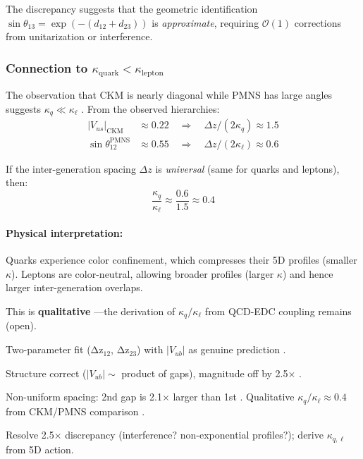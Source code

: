 The discrepancy suggests that the geometric identification
$\sin\theta_{13} = \exp(-(d_{12}+d_{23}))$ is \emph{approximate}, requiring
$\mathcal{O}(1)$ corrections from unitarization or interference.

\subsubsection{Connection to $\kappa_{\text{quark}} < \kappa_{\text{lepton}}$}

The observation that CKM is nearly diagonal while PMNS has large angles
suggests $\kappa_q \ll \kappa_\ell$ \tagP{}. From the observed hierarchies:
\begin{align}
    |V_{us}|_{\text{CKM}} &\approx 0.22 \quad\Rightarrow\quad
    \Delta z/(2\kappa_q) \approx 1.5 \\
    \sin\theta_{12}^{\text{PMNS}} &\approx 0.55 \quad\Rightarrow\quad
    \Delta z/(2\kappa_\ell) \approx 0.6
\end{align}

If the inter-generation spacing $\Delta z$ is \emph{universal} (same for quarks
and leptons), then:
\begin{equation}
    \frac{\kappa_q}{\kappa_\ell} \approx \frac{0.6}{1.5} \approx 0.4
    \label{eq:ch7_kappa_ratio}
\end{equation}

\paragraph{Physical interpretation:}
Quarks experience color confinement, which compresses their 5D profiles
(smaller $\kappa$). Leptons are color-neutral, allowing broader profiles
(larger $\kappa$) and hence larger inter-generation overlaps.

This is \textbf{qualitative} \tagI{}---the derivation of $\kappa_q/\kappa_\ell$
from QCD-EDC coupling remains (open).

\begin{tcolorbox}[colback=yellow!10, colframe=yellow!50!black,
    title=\textbf{Attempt 2.1 Summary: YELLOW}]
\begin{description}[nosep, font=\normalfont\bfseries]
    \item[Achieved:]
        Two-parameter fit (Δz$_{12}$, Δz$_{23}$) with $|V_{ub}|$ as genuine prediction \tagDc{}.

    \item[Partial success:]
        Structure correct ($|V_{ub}| \sim$ product of gaps), magnitude off by 2.5× \tagDc{}.

    \item[Insight gained:]
        Non-uniform spacing: 2nd gap is 2.1× larger than 1st \tagCal{}.
        Qualitative $\kappa_q/\kappa_\ell \approx 0.4$ from CKM/PMNS comparison \tagI{}.

    \item[Open:]
        Resolve 2.5× discrepancy (interference? non-exponential profiles?);
        derive $\kappa_{q,\ell}$ from 5D action.
\end{description}
\end{tcolorbox}

